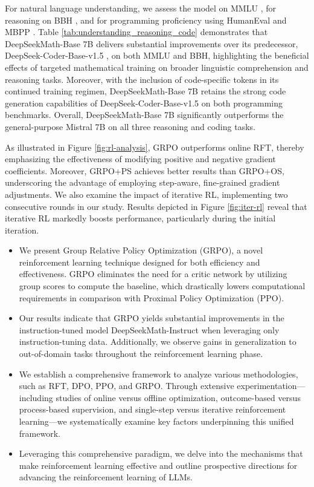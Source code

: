 {For natural language understanding, we assess the model on MMLU \citep{mmlu}, for reasoning on BBH \citep{bbh}, and for programming proficiency using HumanEval \citep{codex} and MBPP \citep{mbpp}. Table \ref{tab:understanding_reasoning_code} demonstrates that DeepSeekMath-Base 7B delivers substantial improvements over its predecessor, DeepSeek-Coder-Base-v1.5 \citep{deepseek-coder}, on both MMLU and BBH, highlighting the beneficial effects of targeted mathematical training on broader linguistic comprehension and reasoning tasks. Moreover, with the inclusion of code-specific tokens in its continued training regimen, DeepSeekMath-Base 7B retains the strong code generation capabilities of DeepSeek-Coder-Base-v1.5 on both programming benchmarks. Overall, DeepSeekMath-Base 7B significantly outperforms the general-purpose Mistral 7B \citep{mistral} on all three reasoning and coding tasks.

As illustrated in Figure \ref{fig:rl-analysis}, GRPO outperforms online RFT, thereby emphasizing the effectiveness of modifying positive and negative gradient coefficients. Moreover, GRPO+PS achieves better results than GRPO+OS, underscoring the advantage of employing step-aware, fine-grained gradient adjustments. We also examine the impact of iterative RL, implementing two consecutive rounds in our study. Results depicted in Figure \ref{fig:iter-rl} reveal that iterative RL markedly boosts performance, particularly during the initial iteration.

\begin{itemize}[topsep=0pt]
    \item We present Group Relative Policy Optimization (GRPO), a novel reinforcement learning technique designed for both efficiency and effectiveness. GRPO eliminates the need for a critic network by utilizing group scores to compute the baseline, which drastically lowers computational requirements in comparison with Proximal Policy Optimization (PPO).
    \item Our results indicate that GRPO yields substantial improvements in the instruction-tuned model DeepSeekMath-Instruct when leveraging only instruction-tuning data. Additionally, we observe gains in generalization to out-of-domain tasks throughout the reinforcement learning phase.
    \item We establish a comprehensive framework to analyze various methodologies, such as RFT, DPO, PPO, and GRPO. Through extensive experimentation—including studies of online versus offline optimization, outcome-based versus process-based supervision, and single-step versus iterative reinforcement learning—we systematically examine key factors underpinning this unified framework.
    \item Leveraging this comprehensive paradigm, we delve into the mechanisms that make reinforcement learning effective and outline prospective directions for advancing the reinforcement learning of LLMs.
\end{itemize}

}
